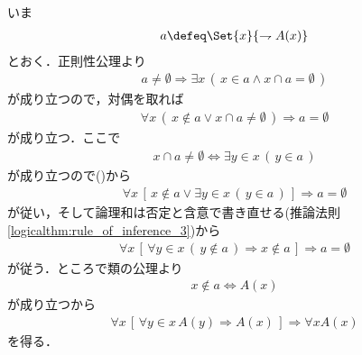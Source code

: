 	\begin{sketch}
		いま
		\begin{align}
			a \defeq \Set{x}{\rightharpoondown A(x)}
		\end{align}
		とおく．正則性公理より
		\begin{align}
			a \neq \emptyset \Longrightarrow 
			\exists x\, (\, x \in a \wedge x \cap a = \emptyset\, )
		\end{align}
		が成り立つので，対偶を取れば
		\begin{align}
			\forall x\, (\, x \notin a \vee x \cap a \neq \emptyset\, )
			\Longrightarrow a = \emptyset
			\label{fom:thm_equivalent_condition_of_axiom_of_regularity_1}
		\end{align}
		が成り立つ．ここで
		\begin{align}
			x \cap a \neq \emptyset \Longleftrightarrow \exists y \in x\, (\, y \in a\, )
		\end{align}
		が成り立つので()から
		\begin{align}
			\forall x\, \left[\, x \notin a \vee \exists y \in x\, (\, y \in a\, )\, \right]
			\Longrightarrow a = \emptyset
			\label{fom:thm_equivalent_condition_of_axiom_of_regularity_2}
		\end{align}
		が従い，そして論理和は否定と含意で書き直せる(推論法則\ref{logicalthm:rule_of_inference_3})から
		\begin{align}
			\forall x\, \left[\, \forall y \in x\, (\, y \notin a\, ) \Longrightarrow x \notin a\, \right]
			\Longrightarrow a = \emptyset
		\end{align}
		が従う．ところで類の公理より
		\begin{align}
			x \notin a \Longleftrightarrow A(x)
		\end{align}
		が成り立つから
		\begin{align}
			\forall x\, \left[\, \forall y \in x\, A(y)
			\Longrightarrow A(x)\, \right]
			\Longrightarrow \forall x A(x)
		\end{align}
		を得る．
		\QED
	\end{sketch}
	
